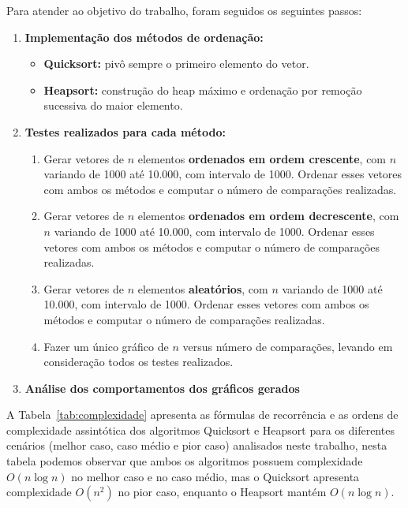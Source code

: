 \documentclass[12pt]{article}
\begin{document}
Para atender ao objetivo do trabalho, foram seguidos os seguintes passos:

\begin{enumerate}
    \item \textbf{Implementação dos métodos de ordenação:}
    \begin{itemize}
        \item \textbf{Quicksort:} pivô sempre o primeiro elemento do vetor.
        \item \textbf{Heapsort:} construção do heap máximo e ordenação por remoção sucessiva do maior elemento.
    \end{itemize}
    \item \textbf{Testes realizados para cada método:}
    \begin{enumerate}
        \item[a)] Gerar vetores de $n$ elementos \textbf{ordenados em ordem crescente}, com $n$ variando de 1000 até 10.000, com intervalo de 1000. Ordenar esses vetores com ambos os métodos e computar o número de comparações realizadas.
        \item[b)] Gerar vetores de $n$ elementos \textbf{ordenados em ordem decrescente}, com $n$ variando de 1000 até 10.000, com intervalo de 1000. Ordenar esses vetores com ambos os métodos e computar o número de comparações realizadas.
        \item[c)] Gerar vetores de $n$ elementos \textbf{aleatórios}, com $n$ variando de 1000 até 10.000, com intervalo de 1000. Ordenar esses vetores com ambos os métodos e computar o número de comparações realizadas.
        \item[d)] Fazer um único gráfico de $n$ versus número de comparações, levando em consideração todos os testes realizados.
    \end{enumerate}
     \item \textbf{Análise dos comportamentos dos gráficos gerados}
\end{enumerate}



A Tabela~\ref{tab:complexidade} apresenta as fórmulas de recorrência e as ordens de complexidade assintótica dos algoritmos Quicksort e Heapsort para os diferentes cenários (melhor caso, caso médio e pior caso) analisados neste trabalho, nesta tabela podemos observar que ambos os algoritmos possuem complexidade $O(n \log n)$ no melhor caso e no caso médio, mas o Quicksort apresenta complexidade $O(n^2)$ no pior caso, enquanto o Heapsort mantém $O(n \log n)$.
\end{document}
